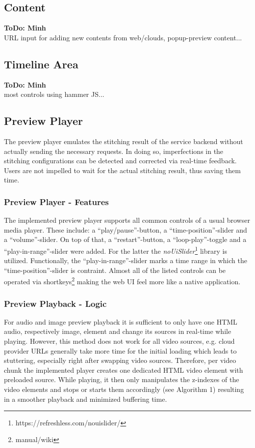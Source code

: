 \documentclass[conference]{IEEEtran}
\begin{document}
\subsection{Content}
\textbf{ToDo: Minh} \\
URL input for adding new contents from web/clouds, popup-preview content...

\subsection{Timeline Area}
\textbf{ToDo: Minh} \\
most controls using hammer JS...

\subsection{Preview Player}
The preview player emulates the stitching result of the service backend without actually sending the necessary requests.
In doing so, imperfections in the stitching configurations can be detected and corrected via real-time feedback.
Users are not impelled to wait for the actual stitching result, thus saving them time.
\\
\subsubsection{Preview Player - Features}
The implemented preview player supports all common controls of a usual browser media player.
These include: a ``play/pause''-button, a ``time-position''-slider and a ``volume''-slider.
On top of that, a ``restart''-button, a ``loop-play''-toggle and a ``play-in-range''-slider were added.
For the latter the \textit{noUiSlider}\footnote{https://refreshless.com/nouislider/} library is utilized.
Functionally, the ``play-in-range''-slider marks a time range in which the ``time-position''-slider is contraint.
Almost all of the listed controls can be operated via shortkeys\footnote{manual/wiki} making the web UI feel more like a native application.
\\
\subsubsection{Preview Playback - Logic}
For audio and image preview playback it is sufficient to only have one HTML audio, respectively image, element and change its sources in real-time while playing.
However, this method does not work for all video sources, e.g. cloud provider URLs generally take more time for the initial loading which leads to stuttering, especially right after swapping video sources.
Therefore, per video chunk the implemented player creates one dedicated HTML video element with preloaded source.
While playing, it then only manipulates the z-indexes of the video elements and stops or starts them accordingly (see Algorithm 1) resulting in a smoother playback and minimized buffering time.
\end{document}
